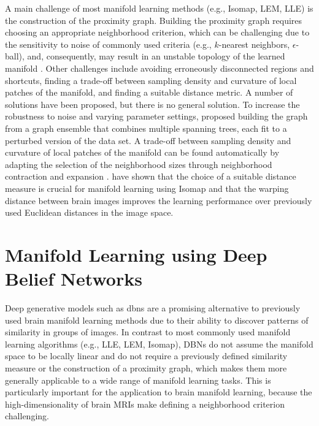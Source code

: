 A main challenge of most manifold learning methods (e.g., Isomap, LEM, LLE) is
the construction of the proximity graph. Building the proximity graph requires
choosing an appropriate neighborhood criterion, which can be challenging due to
the sensitivity to noise of commonly used criteria (e.g., $k$-nearest neighbors,
$\epsilon$-ball), and, consequently, may result in an unstable topology of the
learned manifold \citep{balasubramanian2002}. Other challenges include avoiding
erroneously disconnected regions and shortcuts, finding a trade-off between
sampling density and curvature of local patches of the manifold, and finding a
suitable distance metric. A number of solutions have been proposed, but there is
no general solution. To increase the robustness to noise and varying parameter
settings, \citet{carreira2005} proposed building the graph from a graph ensemble
that combines multiple spanning trees, each fit to a perturbed version of the
data set. A trade-off between sampling density and curvature of local patches of
the manifold can be found automatically by adapting the selection of the
neighborhood sizes through neighborhood contraction and expansion
\citep{zhang2012}. \citet{gerber2010} have shown that the choice of a suitable
distance measure is crucial for manifold learning using Isomap and that the
warping distance between brain images improves the learning performance over
previously used Euclidean distances in the image space.

\section[Manifold learning using deep belief networks]{Manifold Learning using
Deep Belief Networks}

Deep generative models such as \glspl{dbn} are a promising alternative to
previously used brain manifold learning methods due to their ability to discover
patterns of similarity in groups of images. In contrast to most commonly used
manifold learning algorithms (e.g., LLE, LEM, Isomap), DBNs do not assume the
manifold space to be locally linear and do not require a previously defined
similarity measure or the construction of a proximity graph, which makes them
more generally applicable to a wide range of manifold learning tasks. This is
particularly important for the application to brain manifold learning, because
the high-dimensionality of brain MRIs make defining a neighborhood criterion
challenging.


